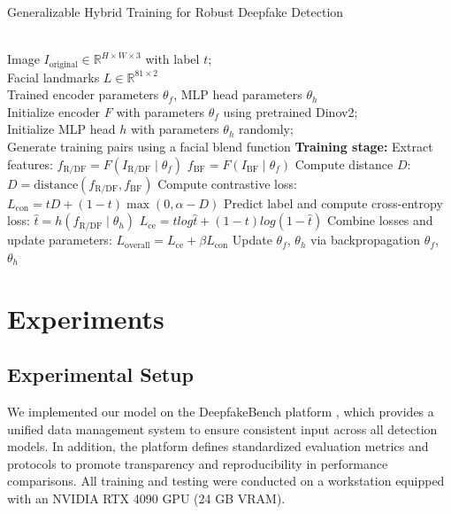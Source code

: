 \documentclass[final,5p,times]{elsarticle}
\begin{document}
\begin{algorithm}[htb]
\renewcommand{\algorithmicrequire}{\textbf{Input:}}
\renewcommand{\algorithmicensure}{\textbf{Initialization:}}
\caption{Generalizable Hybrid Training for Robust Deepfake Detection}
\label{alg:hybrid_training}
\begin{algorithmic}[1]
\REQUIRE ~~\\
    Image $I_{\text{original}} \in \mathbb{R}^{H \times W \times 3}$ with label $t$; \\
    Facial landmarks $L \in \mathbb{R}^{81 \times 2}$
\ENSURE ~~\\
    Trained encoder parameters $\theta_f$, MLP head parameters $\theta_h$ \\
    Initialize encoder $F$ with parameters $\theta_f$ using pretrained Dinov2; \\
    Initialize MLP head $h$ with parameters $\theta_h$ randomly; \\
    Generate training pairs using a facial blend function
\STATE \textbf{Training stage:}
    \STATE Extract features:
    \STATE \quad $f_{\text{R/DF}} = F(I_{\text{R/DF}} \mid \theta_f)$
    \STATE \quad $f_{\text{BF}} = F(I_{\text{BF}} \mid \theta_f)$
    \STATE Compute distance $D$:
    \STATE \quad $D = \text{distance}(f_{\text{R/DF}}, f_{\text{BF}})$
    \STATE Compute contrastive loss:
    \STATE \quad $L_{\text{con}} = tD + (1 - t)\max(0, \alpha - D)$
    \STATE Predict label and compute cross-entropy loss:
    \STATE \quad $\hat{t} = h(f_{\text{R/DF}} \mid \theta_h)$
    \STATE \quad $L_{\text{ce}} = tlog⁡\hat{t}+(1-t)log⁡(1-\hat{t})$
    \STATE Combine losses and update parameters:
    \STATE \quad $L_{\text{overall}} = L_{\text{ce}} + \beta L_{\text{con}}$
    \STATE \quad Update $\theta_f$, $\theta_h$ via backpropagation
\ENDFOR
\RETURN $\theta_f$, $\theta_h$
\end{algorithmic}
\end{algorithm}

\section{Experiments} \label{e}

\subsection{Experimental Setup}

We implemented our model on the DeepfakeBench platform \cite{33}, which provides a unified data management system to ensure consistent input across all detection models. In addition, the platform defines standardized evaluation metrics and protocols to promote transparency and reproducibility in performance comparisons. All training and testing were conducted on a workstation equipped with an NVIDIA RTX 4090 GPU (24 GB VRAM).
\end{document}
